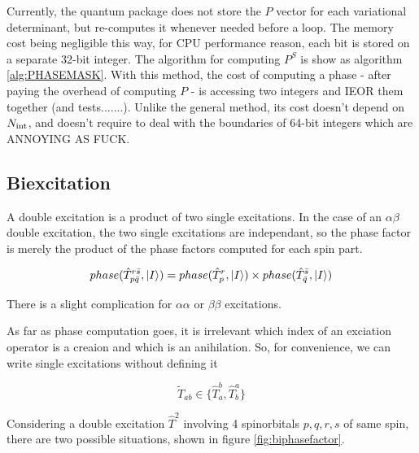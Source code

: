 Currently, the quantum package does not store the $P$ vector for each variational determinant, but re-computes it whenever needed before a loop. The memory cost being negligible this way, for CPU performance reason, each bit is stored on a separate 32-bit integer.
The algorithm for computing $P^S$ is show as algorithm \ref{alg:PHASEMASK}. 
With this method, the cost of computing a phase - after paying the overhead of computing $P$ - is accessing two integers and IEOR them together (and tests.......). Unlike the general method, its cost doesn't depend on ${N_\text{int}}$, and doesn't require to deal with the boundaries of 64-bit integers which are ANNOYING AS FUCK.
        

\subsection{Biexcitation}







A double excitation is a product of two single excitations.
In the case of an $\alpha \beta$ double excitation, the two single excitations are independant, so the phase factor is merely the product of the phase factors computed for each spin part. 


$$phase(\hat T_{p \bar q}^{r \bar s}, \ket I) = phase(\hat T_{p}^{r}, \ket I) \times phase(\hat T_{ \bar q}^{ \bar s}, \ket I) $$

There is a slight complication for $\alpha \alpha$ or $\beta \beta$ excitations.

As far as phase computation goes, it is irrelevant which index of an exciation operator is a creaion and which is an anihilation. So, for convenience, we can write single excitations without defining it

$$\tilde T_{ab} \in \{\hat T_a^b, \hat T_b^a \}$$

Considering a double excitation $\hat T^2$ involving 4 spinorbitals $p,q,r,s$ of same spin, there are two possible situations, shown in figure \ref{fig:biphasefactor}. 


